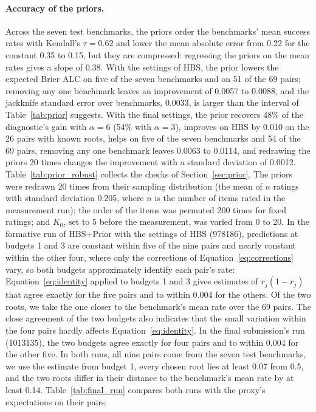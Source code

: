 \documentclass{article}
\begin{document}
\paragraph{Accuracy of the priors.} Across the seven test benchmarks, the priors order the benchmarks' mean success rates with Kendall's $\tau = 0.62$ and lower the mean absolute error from 0.22 for the constant 0.35 to 0.15, but they are compressed: regressing the priors on the mean rates gives a slope of 0.38. With the settings of HBS, the prior lowers the expected Brier ALC on five of the seven benchmarks and on 51 of the 69 pairs; removing any one benchmark leaves an improvement of 0.0057 to 0.0088, and the jackknife standard error over benchmarks, 0.0033, is larger than the interval of Table~\ref{tab:prior} suggests. With the final settings, the prior recovers 48\% of the diagnostic's gain with $\alpha = 6$ (54\% with $\alpha = 3$), improves on HBS by 0.010 on the 26 pairs with known roots, helps on five of the seven benchmarks and 54 of the 69 pairs, removing any one benchmark leaves 0.0063 to 0.0114, and redrawing the priors 20 times changes the improvement with a standard deviation of 0.0012. Table~\ref{tab:prior_robust} collects the checks of Section~\ref{sec:prior}. The priors were redrawn 20 times from their sampling distribution (the mean of $n$ ratings with standard deviation 0.205, where $n$ is the number of items rated in the measurement run); the order of the items was permuted 200 times for fixed ratings; and $K_0$, set to 5 before the measurement, was varied from 0 to 20. In the formative run of HBS+Prior with the settings of HBS (978186), predictions at budgets 1 and 3 are constant within five of the nine pairs and nearly constant within the other four, where only the corrections of Equation~\eqref{eq:corrections} vary, so both budgets approximately identify each pair's rate: Equation~\eqref{eq:identity} applied to budgets 1 and 3 gives estimates of $r_j(1 - r_j)$ that agree exactly for the five pairs and to within 0.004 for the others. Of the two roots, we take the one closer to the benchmark's mean rate over the 69 pairs. The close agreement of the two budgets also indicates that the small variation within the four pairs hardly affects Equation~\eqref{eq:identity}. In the final submission's run (1013135), the two budgets agree exactly for four pairs and to within 0.004 for the other five. In both runs, all nine pairs come from the seven test benchmarks, we use the estimate from budget 1, every chosen root lies at least 0.07 from 0.5, and the two roots differ in their distance to the benchmark's mean rate by at least 0.14. Table~\ref{tab:final_run} compares both runs with the proxy's expectations on their pairs.
\end{document}
